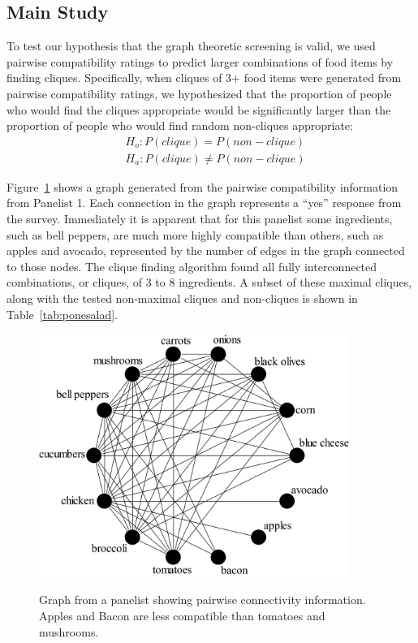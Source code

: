 \subsection{Main Study}
To test our hypothesis that the graph theoretic screening is valid, we used pairwise compatibility ratings to predict larger combinations of food items by finding cliques.  Specifically, when cliques of 3+ food items were generated from pairwise compatibility ratings, we hypothesized that the proportion of people who would find the cliques appropriate would be significantly larger than the proportion of people who would find random non-cliques appropriate:  
\begin{align*}
 & H_o: P(clique) = P(non-clique)\\ 
 & H_a: P(clique) \neq P(non-clique)
\end{align*}

Figure~\ref{fig:saladgraph} shows a graph generated from the pairwise compatibility information from Panelist 1.  Each connection in the graph represents a “yes” response from the survey.  Immediately it is apparent that for this panelist some ingredients, such as bell peppers, are much more highly compatible than others, such as apples and avocado, represented by the number of edges in the graph connected to those nodes.  The clique finding algorithm found all fully interconnected combinations, or cliques, of 3 to 8 ingredients.  A subset of these maximal cliques, along with the tested non-maximal cliques and non-cliques is shown in Table~\ref{tab:ponesalad}.

\begin{figure}[h!]
\caption[A panelist's salad graph.]{Graph from a panelist showing pairwise connectivity information.  Apples and Bacon are less compatible than tomatoes and mushrooms.}
\centering
\includegraphics[width=0.9\textwidth]{./img/ind_super_pairgraph.png}
\label{fig:saladgraph}
\end{figure}

